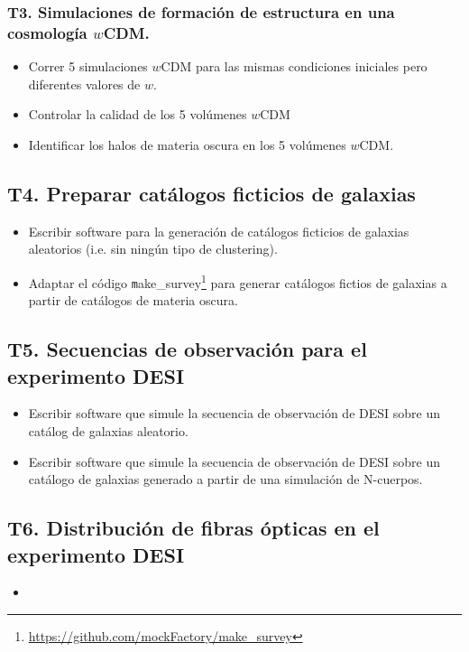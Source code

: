 \subsubsection*{T3. Simulaciones de formaci\'on de estructura en una
  cosmolog\'ia $w$CDM.}
\begin{itemize}
\item[T3.1] Correr 5 simulaciones $w$CDM para las mismas condiciones
  iniciales pero diferentes valores de $w$.
\item[T3.2] Controlar la calidad de los 5 vol\'umenes $w$CDM
\item[T3.3] Identificar los halos de materia oscura en los 5 vol\'umenes $w$CDM.
\end{itemize}

\subsection*{T4. Preparar cat\'alogos ficticios de galaxias}
\begin{itemize}
\item[T4.1] Escribir software para la generaci\'on de cat\'alogos
  ficticios de galaxias aleatorios (i.e. sin ning\'un tipo de
  clustering).
\item[T4.2] Adaptar el c\'odigo {\texttt
  make\_survey}\footnote{\url{https://github.com/mockFactory/make_survey}}
  para generar  cat\'alogos fictios de galaxias a partir de
  cat\'alogos de materia oscura.
\end{itemize}

\subsection*{T5. Secuencias de observaci\'on para el experimento DESI}
\begin{itemize}
\item[T5.1] Escribir software que simule la secuencia de observaci\'on
  de DESI sobre un cat\'alog de galaxias aleatorio.
\item[T5.2] Escribir software que simule la secuencia de observaci\'on
  de DESI sobre un cat\'alogo de galaxias generado a partir de una
  simulaci\'on de N-cuerpos.
\end{itemize}

\subsection*{T6. Distribuci\'on de fibras \'opticas en el experimento DESI}
\begin{itemize}
\item[T6.1]
\end{itemize}

